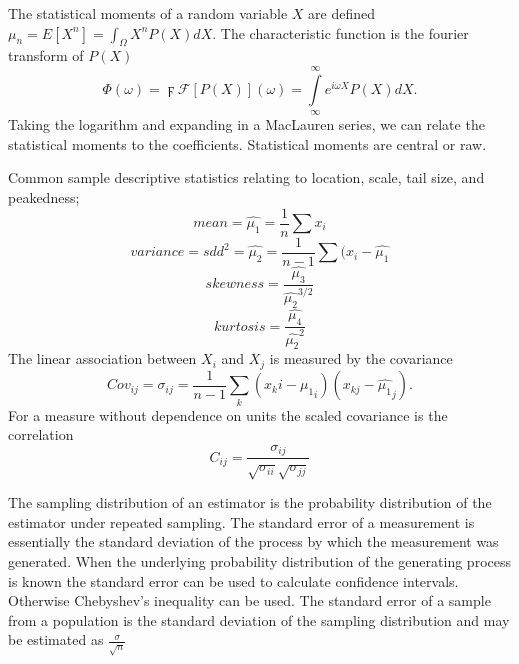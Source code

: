 
The statistical moments of a random variable $X$ are defined $\mu_n = E [ X^n] = \int_\Omega X^n P(X)dX$.  The characteristic function is the fourier transform of $P(X)$ \[\Phi(\omega)=\digamma \mathcal{F} [P(X)] (\omega) = \int\limits_{\infty}^{\infty} e^{i \omega X} P(X) dX.\]  Taking the logarithm and expanding in a MacLauren series, we can relate the statistical moments to the coefficients. Statistical moments are central or raw.

Common sample descriptive statistics relating to location, scale, tail size,  and peakedness;
\[ mean = \hat{\mu_1} = \frac{1}{n}\sum x_i  \]
\[ variance = sdd^2 =  \hat{\mu_2} = \frac{1}{n-1} \sum (x_i- \hat{\mu_1}\]
\[ skewness = \frac{ \hat{\mu_3}}{\hat{\mu_2}^{3/2}} \]
\[ kurtosis = \frac{\hat{\mu_4}}{\hat{\mu_2}^2} \]
The linear association between $X_i$ and $X_j$ is measured by the covariance \[ Cov_{ij} = \sigma_{ij} = \frac{1}{n-1} \sum_k (x_ki - \hat{\mu_1}_i)(x_{kj} - \hat{\mu_1}_j). \]  For a measure without dependence on units the scaled covariance is the correlation \[C_{ij} =\frac{\sigma_{ij}}{\sqrt{\sigma_{ii}}\sqrt{\sigma_{jj}}}\]

%






The sampling distribution of an estimator is the probability distribution of the estimator under repeated sampling.  The standard error of a measurement is essentially the standard deviation of the process by which the measurement was generated.  When the underlying probability distribution of the generating process is known the standard error can be used to calculate confidence intervals.  Otherwise Chebyshev's inequality can be used. The standard error of a sample from a population is the standard deviation of the sampling distribution and may be estimated as $\frac{\sigma}{\sqrt{n}}$


